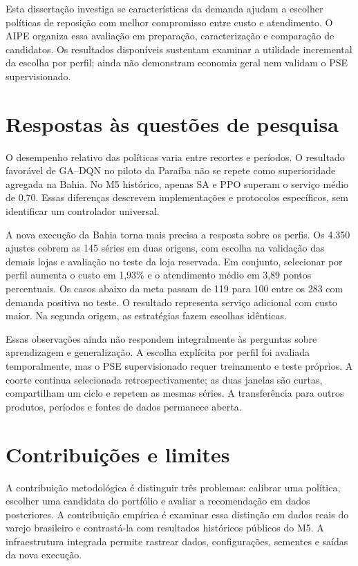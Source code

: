 
Esta dissertação investiga se características da demanda ajudam a escolher políticas de reposição com melhor compromisso entre custo e atendimento. O AIPE organiza essa avaliação em preparação, caracterização e comparação de candidatos. Os resultados disponíveis sustentam examinar a utilidade incremental da escolha por perfil; ainda não demonstram economia geral nem validam o PSE supervisionado.

\section{Respostas às questões de pesquisa}

O desempenho relativo das políticas varia entre recortes e períodos. O resultado favorável de GA--DQN no piloto da Paraíba não se repete como superioridade agregada na Bahia. No M5 histórico, apenas SA e PPO superam o serviço médio de 0,70. Essas diferenças descrevem implementações e protocolos específicos, sem identificar um controlador universal.

A nova execução da Bahia torna mais precisa a resposta sobre os perfis. Os 4.350 ajustes cobrem as 145 séries em duas origens, com escolha na validação das demais lojas e avaliação no teste da loja reservada. Em conjunto, selecionar por perfil aumenta o custo em 1,93\% e o atendimento médio em 3,89 pontos percentuais. Os casos abaixo da meta passam de 119 para 100 entre os 283 com demanda positiva no teste. O resultado representa serviço adicional com custo maior. Na segunda origem, as estratégias fazem escolhas idênticas.

Essas observações ainda não respondem integralmente às perguntas sobre aprendizagem e generalização. A escolha explícita por perfil foi avaliada temporalmente, mas o PSE supervisionado requer treinamento e teste próprios. A coorte continua selecionada retrospectivamente; as duas janelas são curtas, compartilham um ciclo e repetem as mesmas séries. A transferência para outros produtos, períodos e fontes de dados permanece aberta.

\section{Contribuições e limites}

A contribuição metodológica é distinguir três problemas: calibrar uma política, escolher uma candidata do portfólio e avaliar a recomendação em dados posteriores. A contribuição empírica é examinar essa distinção em dados reais do varejo brasileiro e contrastá-la com resultados históricos públicos do M5. A infraestrutura integrada permite rastrear dados, configurações, sementes e saídas da nova execução.

